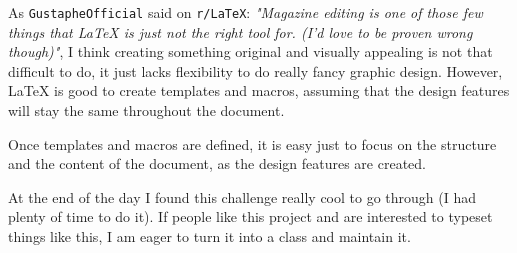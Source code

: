 \documentclass[10pt]{article}
\begin{document}
\begin{article*}

\lettrine{A}{}s \texttt{GustapheOfficial} said on \texttt{r/\LaTeX{}}: \textit{"Magazine editing is one of those few things that LaTeX is just not the right tool for. (I'd love to be proven
wrong though)"}, I think creating something original and visually appealing is not that difficult to do, it just lacks flexibility to do really fancy graphic design. However, \LaTeX{} is good to create templates and macros, assuming that the design features will stay the same throughout the document.

Once templates and macros are defined, it is easy just to focus on the structure and the content of the document, as the design features are created.

At the end of the day I found this challenge really cool to go through (I had plenty of time to do it). If people like this project and are interested to typeset things like this, I am eager to turn it into a class and maintain it.

\end{article*}
\end{document}
